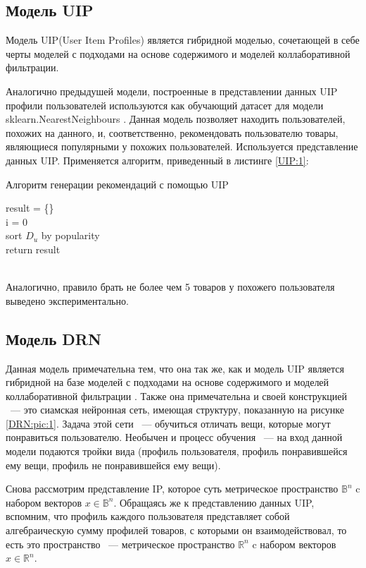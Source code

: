 \documentclass[14pt]{mmcs_article}
\begin{document}
\subsection{Модель UIP}
Модель UIP(User Item Profiles) является гибридной моделью, сочетающей в себе черты моделей с подходами на основе содержимого и моделей коллаборативной фильтрации.

Аналогично предыдушей модели, построенные в представлении данных UIP профили пользователей используются как обучающий датасет для модели sklearn.NearestNeighbours \cite{IP:a1}. Данная модель позволяет находить пользователей, похожих на данного, и, соответственно, рекомендовать пользователю товары, являющиеся популярными у похожих пользователей. Используется представление данных UIP.
Применяется алгоритм, приведенный в листинге \ref{UIP:1}:

\begin{algorithm}[H]\label{UIP:1}
	\caption{Алгоритм генерации рекомендаций с помощью UIP}
	result = \{\} \\
	i = 0 \\
	sort $D_u$ by popularity\\
	return result
\end{algorithm}
\ \\

Аналогично, правило брать не более чем 5 товаров у похожего пользователя выведено экспериментально.
\subsection{Модель DRN}
Данная модель примечательна тем, что она так же, как и модель UIP является гибридной на базе моделей с подходами на основе содержимого и моделей коллаборативной фильтрации \cite{DRN:a1}. Также она примечательна и своей конструкцией ~--- это сиамская нейронная сеть, имеющая структуру, показанную на рисунке \ref{DRN:pic:1}. Задача этой сети ~--- обучиться отличать вещи, которые могут понравиться пользователю. Необычен и процесс обучения ~--- на вход данной модели подаются тройки вида (профиль пользователя, профиль понравившейся ему вещи, профиль не понравившейся ему вещи). 

Снова рассмотрим представление IP, которое суть метрическое пространство $\mathbb{B}^n$ c набором векторов $x \in \mathbb{B}^n$. Обращаясь же к представлению данных UIP, вспомним, что профиль каждого пользователя представляет собой алгебраическую сумму профилей товаров, с которыми он взаимодействовал, то есть это пространство ~--- метрическое пространство $\mathbb{R}^n$ c набором векторов $x \in \mathbb{R}^n$.
\end{document}
